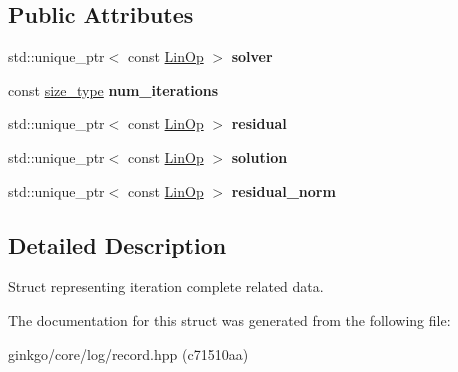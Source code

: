\subsection*{Public Attributes}
\begin{DoxyCompactItemize}
\item 
\mbox{\label{structgko_1_1log_1_1iteration__complete__data_af485c2d5eff3114076e057b9870106a8}} 
std\+::unique\+\_\+ptr$<$ const \hyperlink{classgko_1_1LinOp}{Lin\+Op} $>$ {\bfseries solver}
\item 
\mbox{\label{structgko_1_1log_1_1iteration__complete__data_a8d5fd7bf89def95a904e95b3f0848594}} 
const \hyperlink{namespacegko_a6e5c95df0ae4e47aab2f604a22d98ee7}{size\+\_\+type} {\bfseries num\+\_\+iterations}
\item 
\mbox{\label{structgko_1_1log_1_1iteration__complete__data_a52473dac8d5ac7849b6dbd7523cdeb37}} 
std\+::unique\+\_\+ptr$<$ const \hyperlink{classgko_1_1LinOp}{Lin\+Op} $>$ {\bfseries residual}
\item 
\mbox{\label{structgko_1_1log_1_1iteration__complete__data_a232f312a1a4c2f8817e208ec2013c454}} 
std\+::unique\+\_\+ptr$<$ const \hyperlink{classgko_1_1LinOp}{Lin\+Op} $>$ {\bfseries solution}
\item 
\mbox{\label{structgko_1_1log_1_1iteration__complete__data_a26a787138ac7faeced0420c5d02371cb}} 
std\+::unique\+\_\+ptr$<$ const \hyperlink{classgko_1_1LinOp}{Lin\+Op} $>$ {\bfseries residual\+\_\+norm}
\end{DoxyCompactItemize}


\subsection{Detailed Description}
Struct representing iteration complete related data. 

The documentation for this struct was generated from the following file\+:\begin{DoxyCompactItemize}
\item 
ginkgo/core/log/record.\+hpp (c71510aa)\end{DoxyCompactItemize}
